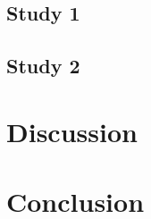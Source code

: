 \documentclass[journal]{IEEEtran}
\begin{document}
		\subsection{Study 1}
			\lipsum[6]
		
		\subsection{Study 2}
			\lipsum[7]
	
	\section{Discussion}
	\lipsum[11-12] %
	
	\section{Conclusion}
	\lipsum[13] %
	
	
	
\end{document}
